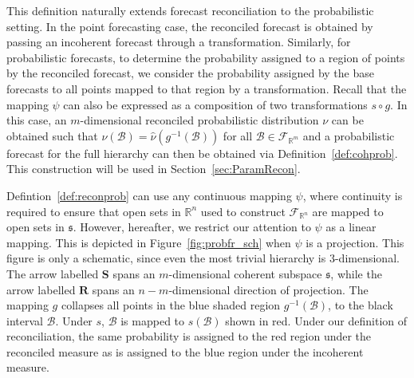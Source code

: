 \documentclass[12pt]{article}
\theoremstyle{definition}
\begin{document}
This definition naturally extends forecast reconciliation to the probabilistic setting. In the point forecasting case, the reconciled forecast is obtained by passing an incoherent forecast through a transformation. Similarly, for probabilistic forecasts, to determine the probability assigned to a region of points by the reconciled forecast, we consider the probability assigned by the base forecasts to all points mapped to that region by a transformation.  Recall that the mapping $\psi$ can also be expressed as a composition of two transformations $s\circ g$. In this case, an $m$-dimensional reconciled probabilistic distribution $\nu$ can be obtained such that $\nu(\mathcal{B})= \hat{\nu}(g^{-1}(\mathcal{B}))$ for all $\mathcal{B} \in \mathscr{F}_{\mathbb{R}^m}$ and a probabilistic forecast for the full hierarchy can then be obtained via Definition~\ref{def:cohprob}.  This construction will be used in Section~\ref{sec:ParamRecon}.

Defintion~\ref{def:reconprob} can use any continuous mapping $\psi$, where continuity is required to ensure that open sets in $\mathbb{R}^n$ used to construct $\mathscr{F}_{\mathbb{R}^n}$ are mapped to open sets in $\mathfrak{s}$.  However, hereafter, we restrict our attention to $\psi$ as a linear mapping.  This is depicted in Figure~\ref{fig:probfr_sch} when $\psi$ is a projection.  This figure is only a schematic, since even the most trivial hierarchy is $3$-dimensional.  The arrow labelled $\bm{S}$ spans an $m$-dimensional coherent subspace $\mathfrak{s}$, while the arrow labelled $\bm{R}$ spans an $n-m$-dimensional direction of projection.  The mapping $g$ collapses all points in the blue shaded region $g^{-1}(\mathcal{B})$, to the black interval $\mathcal{B}$. Under $s$, $\mathcal{B}$ is mapped to $s(\mathcal{B})$ shown in red.  Under our definition of reconciliation, the same probability is assigned to the red region under the reconciled measure as is assigned to the blue region under the incoherent measure.
\end{document}

